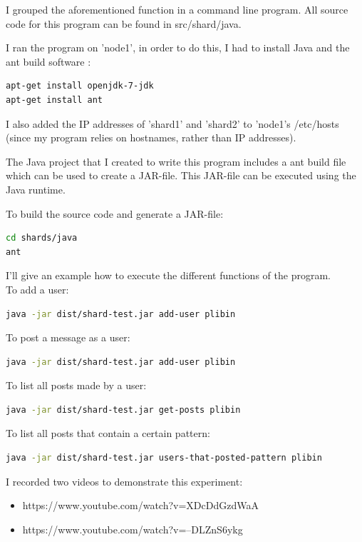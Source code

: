 \documentclass[12pt]{report}
\begin{document}
I grouped the aforementioned function in a command line program. All
source code for this program can be found in src/shard/java.

I ran the program on 'node1', in order to do this, I had to install
Java \cite{java_soft} and the ant build software \cite{ant_soft}:
\begin{lstlisting}[language=bash]
apt-get install openjdk-7-jdk
apt-get install ant
\end{lstlisting}

I also added the IP addresses of 'shard1' and 'shard2' to 'node1's
/etc/hosts (since my program relies on hostnames, rather than IP
addresses).

The Java project that I created to write this program includes a ant build
file which can be used to create a JAR-file. This JAR-file can be
executed using the Java runtime. 

To build the source code and generate a JAR-file:
\begin{lstlisting}[language=bash]
cd shards/java
ant
\end{lstlisting}

I'll give an example how to execute the different functions of the
program.\\
To add a user:
\begin{lstlisting}[language=bash]
java -jar dist/shard-test.jar add-user plibin
\end{lstlisting}
To post a message as a user:
\begin{lstlisting}[language=bash]
java -jar dist/shard-test.jar add-user plibin
\end{lstlisting}
To list all posts made by a user:
\begin{lstlisting}[language=bash]
java -jar dist/shard-test.jar get-posts plibin
\end{lstlisting}
To list all posts that contain a certain pattern:
\begin{lstlisting}[language=bash]
java -jar dist/shard-test.jar users-that-posted-pattern plibin
\end{lstlisting}

I recorded two videos to demonstrate this experiment:
\begin{itemize}
\item https://www.youtube.com/watch?v=XDcDdGzdWaA
\item https://www.youtube.com/watch?v=--DLZnS6ykg
\end{itemize}
\end{document}
